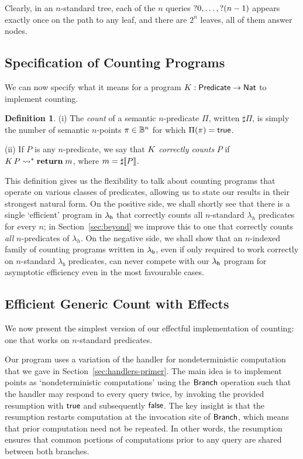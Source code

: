 \documentclass[12pt,phd,lfcs,twoside,openright,logo,leftchapter,normalheadings]{infthesis}
\theoremstyle{plain}
\theoremstyle{definition}
\newtheorem{definition}[theorem]{Definition}
\begin{document}
Clearly, in an $n$-standard tree, each of the $n$ queries $\mathord{?} 0,\dots, \mathord{?}(n-1)$
appears exactly once on the path to any leaf, and there are $2^n$ leaves, all of them answer nodes.

\subsection{Specification of Counting Programs}
\label{sec:counting}

We can now specify what it means for a program
$K : \mathsf{Predicate} \to \mathsf{Nat}$ to implement counting.

\begin{definition} \label{def:counting-function}
(i) The \emph{count} of a semantic $n$-predicate $\Pi$, written $\sharp \Pi$,
is simply the number of semantic $n$-points $\pi \in \mathbb{B}^n$ for which $\Pi(\pi)=\mathsf{true}$.

(ii) If $P$ is any $n$-predicate, we say that $K$ \emph{correctly counts} $P$ if
$K\,P \leadsto^\ast \mathbf{return}\;m$, where $m = \sharp \val{P}$.
\end{definition}

This definition gives us the flexibility to talk about counting
programs that operate on various classes of predicates, allowing us to
state our results in their strongest natural form. On the positive
side, we shall shortly see that there is a single `efficient' program
in $\lambda_{\mathsf{h}}$ that correctly counts all $n$-standard $\lambda_h$
predicates for every $n$; in Section~\ref{sec:beyond} we improve this
to one that correctly counts \emph{all} $n$-predicates of $\lambda_h$.
On the negative side, we shall show that an $n$-indexed family of
counting programs written in $\lambda_{\mathsf{b}}$, even if only required to work
correctly on $n$-standard $\lambda_b$ predicates, can never compete
with our $\lambda_{\mathsf{h}}$ program for asymptotic efficiency even in the most
favourable cases.

\subsection{Efficient Generic Count with Effects}
\label{sec:effectful-counting}

We now present the simplest version of our effectful implementation of
counting: one that works on $n$-standard predicates.

Our program uses a variation of the handler for
nondeterministic computation that we gave in
Section~\ref{sec:handlers-primer}.
The main idea is to implement points as `nondeterministic computations'
using the $\mathsf{Branch}$ operation such that the handler may respond to every query twice,
by invoking the provided resumption with $\mathsf{true}$ and subsequently $\mathsf{false}$.
The key insight is that the resumption restarts computation at the invocation
site of $\mathsf{Branch}$, which means that prior computation need not be repeated.
In other words, the resumption ensures that common portions of computations
prior to any query are shared between both branches.
\end{document}
